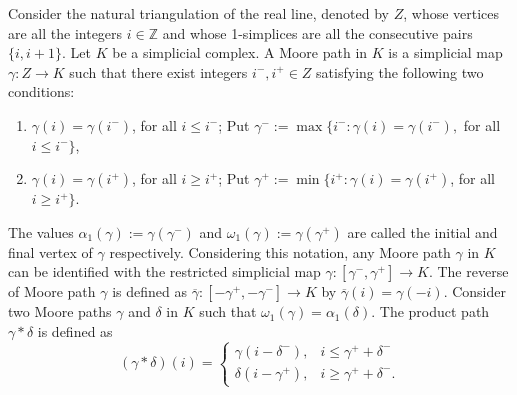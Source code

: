 \documentclass[preprint,11pt %
]{hjm1}
\theoremstyle{definition}
\begin{document}
Consider the natural triangulation of the real line, denoted by $Z$, whose vertices are all the integers $i\in \mathbb{Z}$ and whose 1-simplices are all the consecutive pairs $\lbrace i,i + 1\rbrace$.
Let $K$ be a simplicial complex. A Moore path in $K$ is a simplicial map $\gamma : Z \to K$
such that there exist integers $ i^-,i^+ \in Z$ satisfying the following two conditions:
\begin{enumerate}
\item[(i)]
$\gamma (i)=\gamma (i^-)$, for all $i\leq i^-$; Put $\gamma ^-:=\max \lbrace i^-:\gamma (i)=\gamma (i^-),$  for all $i\leq i^- \rbrace$,
\item[(ii)]
$\gamma (i)=\gamma (i^+)$, for all $i\geq i^+$; Put $\gamma ^+:=\min \lbrace i^+:\gamma (i)=\gamma (i^+)$,  for all $i\geq i^+ \rbrace$.
\end{enumerate}
The values $\alpha_1 (\gamma):= \gamma (\gamma ^- )$ and $\omega_1 (\gamma ):=\gamma (\gamma ^+)$ are called the initial and final vertex of $\gamma $ respectively. 
Considering this notation, any Moore path $\gamma $ in $K$ can be identified with the restricted simplicial map $\gamma : [\gamma ^-,\gamma ^+] \to K$.
The reverse of Moore path $\gamma$ is defined as $\overline{\gamma } :[-\gamma ^+,-\gamma ^-] \to K$ by
$
\overline{\gamma }(i) =\gamma (-i)
$.
Consider two Moore paths $\gamma $ and $\delta $  in $K$ such that $\omega_1 (\gamma ) = \alpha_1 (\delta )$. The product path $\gamma \ast \delta$ is defined as 
\[
(\gamma \ast \delta )(i)=
\begin{cases}
\gamma (i-\delta ^-), & i\leq \gamma ^+ +\delta ^- \\
\delta (i-\gamma ^+ ), &  i\geq \gamma ^+ +\delta ^- .
\end{cases}
\]
\end{document}
